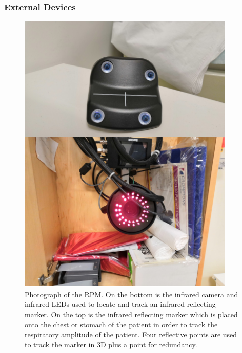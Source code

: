             \subsubsection{External Devices} \label{sec:external_devices}
                \begin{figure}
                    \centering
                        
                    \includegraphics[width=1.0\linewidth]{figures/background_rpm.png}
                        
                    \captionsetup{singlelinecheck=false, justification=raggedright}
                    \caption{Photograph of the \gls{RPM}. On the bottom is the infrared camera and infrared \glspl{LED} used to locate and track an infrared reflecting marker. On the top is the infrared reflecting marker which is placed onto the chest or stomach of the patient in order to track the respiratory amplitude of the patient. Four reflective points are used to track the marker in \gls{3D} plus a point for redundancy.} \label{fig:external_devices_rpm}
                \end{figure}
                
